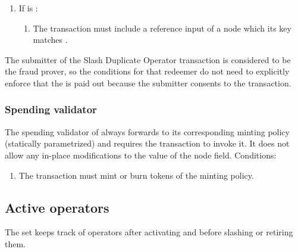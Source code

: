 \documentclass[../midgard.tex]{subfiles}
\begin{document}
\begin{description}
\begin{enumerate}
\begin{enumerate}
                    \item Let  be the policy ID in the corresponding field of the Midgard hub oracle.
                    \item The transaction must include a reference input of an  node which its key matches .
                \end{enumerate}
            \item If  is :
                \begin{enumerate}
                    \item The transaction must include a reference input of a  node which its key matches .
                \end{enumerate}
        \end{enumerate}
    The submitter of the Slash Duplicate Operator transaction is considered to be the fraud prover, so the conditions for that redeemer do not need to explicitly enforce that the  is paid out because the submitter consents to the transaction.
\end{description}

\subsubsection{Spending validator}
\label{h:registered-operators-spending-validator}

The spending validator of  always forwards to its corresponding minting policy (statically parametrized) and requires the transaction to invoke it.
It does not allow any in-place modifications to the  value of the node  field.
Conditions:
\begin{enumerate}
    \item The transaction must mint or burn tokens of the  minting policy.
\end{enumerate}

\subsection{Active operators}
\label{h:active-operators}

The  set keeps track of operators after activating and before slashing or retiring them.
\end{document}
